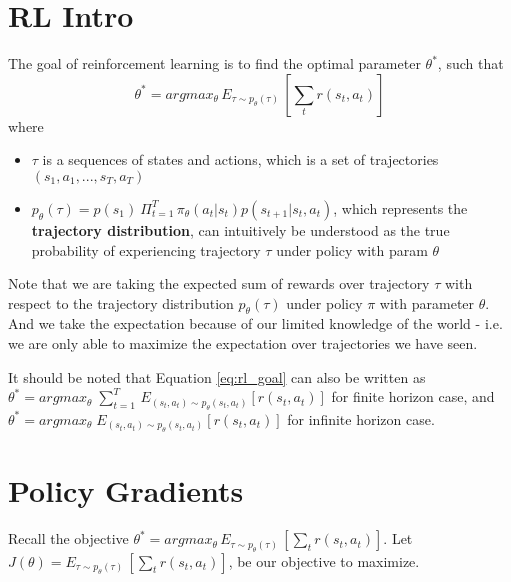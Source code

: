 \documentclass[11pt]{article} %
\begin{document}

\section{RL Intro}
The goal of reinforcement learning is to find the optimal parameter $\theta^*$, such that 
\begin{equation}\label{eq:rl_goal}
    \theta^* = argmax_\theta\, E_{\tau \sim p_\theta(\tau)}\,[\sum_t r(s_t, a_t)]
\end{equation}
where
\begin{itemize}
    \item $\tau$ is a sequences of states and actions, which is a set of trajectories $(s_1, a_1, ..., s_T, a_T)$
    \item $p_\theta(\tau) = p(s_1)\: \Pi^T_{t=1}\,\pi_\theta(a_t|s_t)p(s_{t+1}|s_t, a_t)$, which represents the \textbf{trajectory distribution}, can intuitively be understood as the true probability of experiencing trajectory $\tau$ under policy with param $\theta$
\end{itemize}
Note that we are taking the expected sum of rewards over trajectory $\tau$ with respect to the trajectory distribution $p_\theta(\tau)$ under policy $\pi$ with parameter $\theta$. And we take the expectation because of our limited knowledge of the world - i.e. we are only able to maximize the expectation over trajectories we have seen.

It should be noted that Equation \ref{eq:rl_goal} can also be written as $\theta^* = argmax_\theta \; \sum_{t=1}^T\, E_{(s_t, a_t) \sim p_\theta(s_t, a_t)}[r(s_t, a_t)]$ for finite horizon case, and $\theta^* = argmax_\theta \; E_{(s_t, a_t) \sim p_\theta(s_t, a_t)}[r(s_t, a_t)]$ for infinite horizon case.

\section{Policy Gradients}
Recall the objective $\theta^* = argmax_\theta\, E_{\tau \sim p_\theta(\tau)}\,[\sum_t r(s_t, a_t)]$. Let $J(\theta) = E_{\tau \sim p_\theta(\tau)}\,[\sum_t r(s_t, a_t)]$, be our objective to maximize. 
\end{document}
